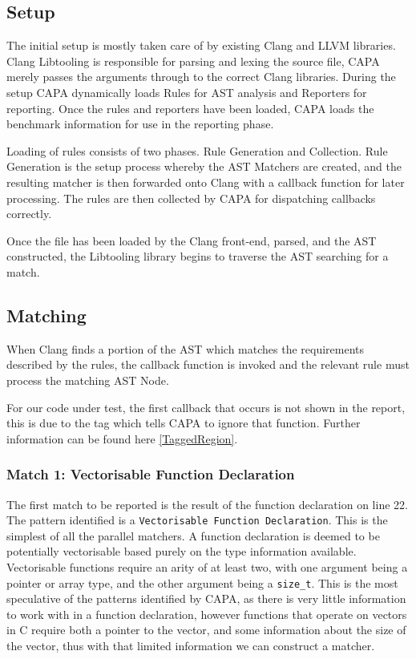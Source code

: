 \subsection{Setup}
The initial setup is mostly taken care of by existing Clang and LLVM libraries. Clang Libtooling is
responsible for parsing and lexing the source file, CAPA merely passes the arguments through to the
correct Clang libraries. During the setup CAPA dynamically loads Rules for AST analysis and
Reporters for reporting. Once the rules and reporters have been loaded, CAPA loads the benchmark
information for use in the reporting phase.

Loading of rules consists of two phases. Rule Generation and Collection. Rule Generation is the
setup process whereby the AST Matchers are created, and the resulting matcher is then forwarded onto
Clang with a callback function for later processing. The rules are then collected by CAPA for
dispatching callbacks correctly.

Once the file has been loaded by the Clang front-end, parsed, and the AST constructed, the
Libtooling library begins to traverse the AST searching for a match.

\subsection{Matching}
When Clang finds a portion of the AST which matches the requirements described by the rules, the
callback function is invoked and the relevant rule must process the matching AST Node.

For our code under test, the first callback that occurs is not shown in the report, this is due to
the tag which tells CAPA to ignore that function. Further information can be found here
\ref{TaggedRegion}.

\subsubsection{Match 1: Vectorisable Function Declaration}
The first match to be reported is the result of the function declaration on line 22. The pattern
identified is a \lstinline{Vectorisable Function Declaration}. This is the simplest of all the
parallel matchers. A function declaration is deemed to be potentially vectorisable based purely on
the type information available. Vectorisable functions require an arity of at least two, with one
argument being a pointer or array type, and the other argument being a \lstinline{size_t}. This is the
most speculative of the patterns identified by CAPA, as there is very little information to work
with in a function declaration, however functions that operate on vectors in C require both a
pointer to the vector, and some information about the size of the vector, thus with that limited
information we can construct a matcher.

